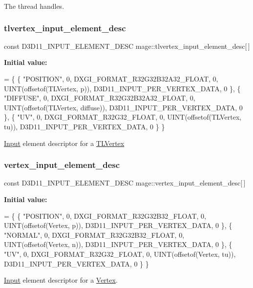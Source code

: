 The thread handles. \hypertarget{namespacemage_a0f27594da3814c163fe995326acf6c5e}{}\label{namespacemage_a0f27594da3814c163fe995326acf6c5e} 
\subsubsection{\texorpdfstring{tlvertex\+\_\+input\+\_\+element\+\_\+desc}{tlvertex\_input\_element\_desc}}
{\footnotesize\ttfamily const D3\+D11\+\_\+\+I\+N\+P\+U\+T\+\_\+\+E\+L\+E\+M\+E\+N\+T\+\_\+\+D\+E\+SC mage\+::tlvertex\+\_\+input\+\_\+element\+\_\+desc\mbox{[}$\,$\mbox{]}}

{\bfseries Initial value\+:}
\begin{DoxyCode}
= \{
        \{ \textcolor{stringliteral}{"POSITION"}, 0, DXGI\_FORMAT\_R32G32B32A32\_FLOAT, 0, UINT(offsetof(TLVertex, p)), 
      D3D11\_INPUT\_PER\_VERTEX\_DATA, 0 \},
        \{ \textcolor{stringliteral}{"DIFFUSE"}, 0, DXGI\_FORMAT\_R32G32B32A32\_FLOAT, 0, UINT(offsetof(TLVertex, diffuse)), 
      D3D11\_INPUT\_PER\_VERTEX\_DATA, 0 \},
        \{ \textcolor{stringliteral}{"UV"}, 0, DXGI\_FORMAT\_R32G32\_FLOAT, 0, UINT(offsetof(TLVertex, tu)), D3D11\_INPUT\_PER\_VERTEX\_DATA, 
      0 \}
    \}
\end{DoxyCode}
\hyperlink{classmage_1_1_input}{Input} element descriptor for a \hyperlink{structmage_1_1_t_l_vertex}{T\+L\+Vertex} \hypertarget{namespacemage_a8647e0bbbbe87e5c6d7a4d4622230119}{}\label{namespacemage_a8647e0bbbbe87e5c6d7a4d4622230119} 
\subsubsection{\texorpdfstring{vertex\+\_\+input\+\_\+element\+\_\+desc}{vertex\_input\_element\_desc}}
{\footnotesize\ttfamily const D3\+D11\+\_\+\+I\+N\+P\+U\+T\+\_\+\+E\+L\+E\+M\+E\+N\+T\+\_\+\+D\+E\+SC mage\+::vertex\+\_\+input\+\_\+element\+\_\+desc\mbox{[}$\,$\mbox{]}}

{\bfseries Initial value\+:}
\begin{DoxyCode}
= \{
        \{ \textcolor{stringliteral}{"POSITION"}, 0, DXGI\_FORMAT\_R32G32B32\_FLOAT, 0, UINT(offsetof(Vertex, p)), 
      D3D11\_INPUT\_PER\_VERTEX\_DATA, 0 \},
        \{ \textcolor{stringliteral}{"NORMAL"}, 0, DXGI\_FORMAT\_R32G32B32\_FLOAT, 0, UINT(offsetof(Vertex, n)), 
      D3D11\_INPUT\_PER\_VERTEX\_DATA, 0 \},
        \{ \textcolor{stringliteral}{"UV"}, 0, DXGI\_FORMAT\_R32G32\_FLOAT, 0, UINT(offsetof(Vertex, tu)), D3D11\_INPUT\_PER\_VERTEX\_DATA, 0 
      \}
    \}
\end{DoxyCode}
\hyperlink{classmage_1_1_input}{Input} element descriptor for a \hyperlink{structmage_1_1_vertex}{Vertex}. \hypertarget{namespacemage_a17c3448f9fba7521d188d30bdfb77e33}{}\label{namespacemage_a17c3448f9fba7521d188d30bdfb77e33} 

